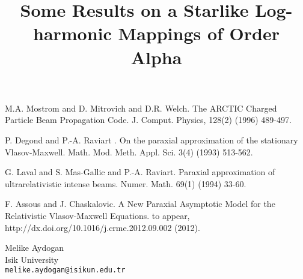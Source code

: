 \documentclass[article,A4,11pt]{llncs}%
\begin{document}

\begin{thebibliography}{10}
{\sc M.A. Mostrom and D. Mitrovich and D.R. Welch}. {The ARCTIC Charged Particle Beam Propagation Code}. J. Comput. Physics, 128(2) (1996) 489-497.

{\sc P. Degond and P.-A. Raviart }. {On the paraxial approximation of the stationary Vlasov-Maxwell}.  Math. Mod. Meth. Appl. Sci. 3(4) (1993) 513-562.

{\sc G. Laval and S. Mas-Gallic and P.-A. Raviart}. {Paraxial approximation of ultrarelativistic intense beams}. Numer. Math. 69(1) (1994) 33-60.

{\sc F. Assous and J. Chaskalovic}. {A New Paraxial Asymptotic Model for the Relativistic Vlasov-Maxwell Equations}. to appear, http://dx.doi.org/10.1016/j.crme.2012.09.002 (2012).
\end{thebibliography}

\title{Some  Results on a Starlike  Log-harmonic Mappings of Order Alpha}
 \author{} \institute{}
\maketitle
\begin{center}
{\large Melike  Aydogan}\\
Isik University\\
{\tt melike.aydogan@isikun.edu.tr}
\end{center}
\end{document}
